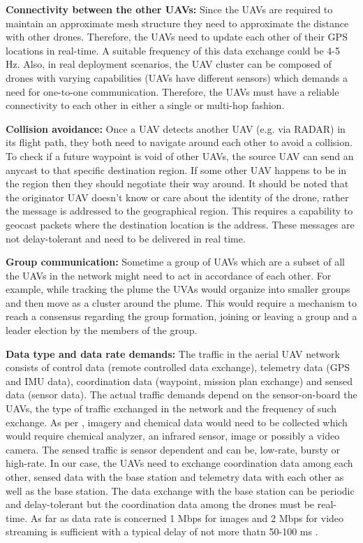 \textbf{Connectivity between the other UAVs:} Since the UAVs are required to maintain an approximate mesh structure they need to approximate the distance with other drones. Therefore, the UAVs need to update each other of their GPS locations in real-time. A suitable frequency of this data exchange could be 4-5 Hz. Also, in real deployment scenarios, the UAV cluster can be composed of drones with varying capabilities (UAVs have different sensors) which demands a need for one-to-one communication. Therefore, the UAVs must have a reliable connectivity to each other in either a single or multi-hop fashion. 

\textbf{Collision avoidance:} Once a UAV detects another UAV (e.g. via RADAR) in its flight path, they both need to navigate around each other to avoid a collision. To check if a future waypoint is void of other UAVs, the source UAV can send an anycast to that specific destination region. If some other UAV happens to be in the region then they should negotiate their way around. It should be noted that the originator UAV doesn't know or care about the identity of the drone, rather the message is addressed to the geographical region. This requires a capability to geocast packets where the destination location is the address. These messages are not delay-tolerant and need to be delivered in real time.

\textbf{Group communication:} Sometime a group of UAVs which are a subset of all the UAVs in the network might need to act in accordance of each other. For example, while tracking the plume the UVAs would organize into smaller groups and then move as a cluster around the plume. This would require a mechanism to reach a consensus regarding the group formation, joining or leaving a group and a leader election by the members of the group. 

\textbf{Data type and data rate demands:} The traffic in the aerial UAV network consists of control data (remote controlled data exchange), telemetry data (GPS and IMU data), coordination data (waypoint, mission plan exchange) and sensed data (sensor data). The actual traffic demands depend on the sensor-on-board the UAVs, the type of traffic exchanged in the network and the frequency of such exchange. As per \cite{NASA_UAV_mission_parameters}, imagery and chemical data would need to be collected which would require chemical analyzer, an infrared sensor, image or possibly a video camera. The sensed traffic is sensor dependent and can be, low-rate, bursty or high-rate. In our case, the UAVs need to exchange coordination data among each other, sensed data with the base station and telemetry data with each other as well as the base station. The data exchange with the base station can be periodic and delay-tolerant but the coordination data among the drones must be real-time. As far as data rate is concerned 1 Mbps for images and 2 Mbps for video streaming is sufficient with a typical delay of not more thatn 50-100 ms \cite{7463007}. 

